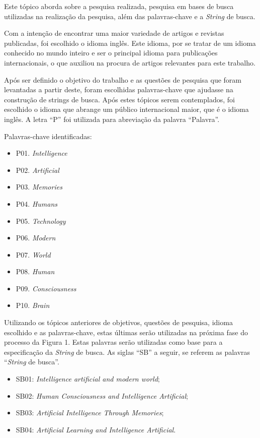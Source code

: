 Este tópico aborda sobre a pesquisa realizada, pesquisa em bases de busca utilizadas na realização da pesquisa, além das palavras-chave e a \textit{String} de busca.

Com a intenção de encontrar uma maior variedade de artigos e revistas publicadas, foi escolhido o idioma inglês. Este idioma, por se tratar de um idioma conhecido no mundo inteiro e ser o principal idioma para publicações internacionais, o que auxiliou na procura de artigos relevantes para este trabalho.

Após ser definido o objetivo do trabalho e as questões de pesquisa que foram levantadas a partir deste, foram escolhidas palavras-chave que ajudasse na construção de strings de busca. Após estes tópicos serem contemplados, foi escolhido o idioma que abrange um público internacional maior, que é o idioma inglês. A letra “P” foi utilizada para abreviação da palavra “Palavra”.

Palavras-chave identificadas:

\begin{itemize}
	\item P01. \textit{Intelligence}
	\item P02. \textit{Artificial}
	\item P03. \textit{Memories}
	\item P04. \textit{Humans}
    \item P05. \textit{Technology}
    \item P06. \textit{Modern}
    \item P07. \textit{World}
    \item P08. \textit{Human}
    \item P09. \textit{Consciousness}
    \item P10. \textit{Brain}
\end{itemize}

Utilizando os tópicos anteriores de objetivos, questões de pesquisa, idioma escolhido e as palavras-chave, estas últimas serão utilizadas na próxima fase do processo da Figura 1. Estas palavras serão utilizadas como base para a especificação da \textit{String} de busca. As siglas “SB” a seguir, se referem as palavras “\textit{String} de busca”.

\begin{itemize}
    \item SB01: \textit{Intelligence artificial and modern world};
	\item SB02: \textit{Human Consciousness and Intelligence Artificial};
	\item SB03: \textit{Artificial Intelligence Through Memories};
    \item SB04: \textit{Artificial Learning and Intelligence Artificial}.
\end{itemize}

